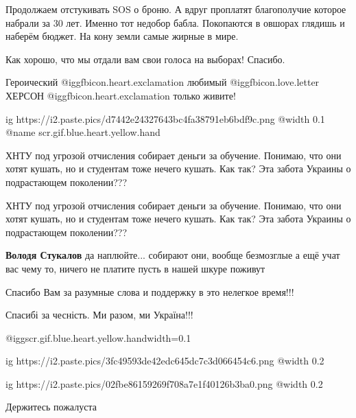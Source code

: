 \begin{itemize}

Продолжаем отстукивать SOS о броню. А вдруг проплатят благополучие которое
набрали за 30 лет. Именно тот недобор бабла. Покопаются в овшорах глядишь и
наберём бюджет. На кону земли самые жирные в мире.

Как хорошо, что мы отдали вам свои голоса на выборах! Спасибо.

Героический @igg{fbicon.heart.exclamation} любимый @igg{fbicon.love.letter}
ХЕРСОН @igg{fbicon.heart.exclamation} только живите!


\ifcmt
  ig https://i2.paste.pics/d7442e24327643bc4fa38791eb6bdf9c.png
  @width 0.1
	@name scr.gif.blue.heart.yellow.hand
\fi



ХНТУ под угрозой отчисления собирает деньги за обучение. Понимаю, что они хотят
кушать, но и студентам тоже нечего кушать. Как так? Эта забота Украины о
подрастающем поколении???


ХНТУ под угрозой отчисления собирает деньги за обучение. Понимаю, что они хотят
кушать, но и студентам тоже нечего кушать. Как так? Эта забота Украины о
подрастающем поколении???

\textbf{Володя Стукалов} да наплюйте... собирают они, вообще безмозглые а ещё учат вас
чему то, ничего не платите пусть в нашей шкуре поживут

Спасибо Вам за разумные слова и поддержку в это нелегкое время!!!

Спасибі за чесність. Ми разом, ми Україна!!!


@igg{scr.gif.blue.heart.yellow.hand}{width=0.1}


\ifcmt
  ig https://i2.paste.pics/3fc49593de42edc645dc7c3d066454c6.png
  @width 0.2
\fi


\ifcmt
  ig https://i2.paste.pics/02fbe86159269f708a7e1f40126b3ba0.png
  @width 0.2
\fi

Держитесь пожалуста



\end{itemize}
